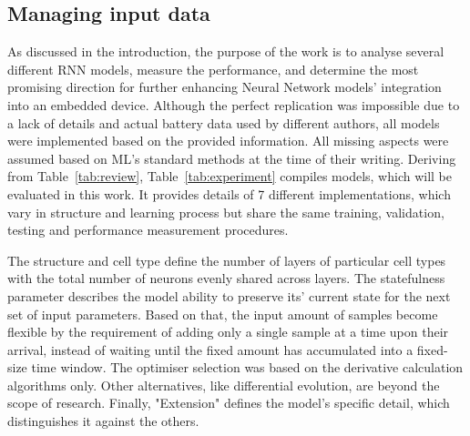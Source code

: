 %
%
\subsection{Managing input data} \label{subsec:RNN}
As discussed in the introduction, the purpose of the work is to analyse several different RNN models, measure the performance, and determine the most promising direction for further enhancing Neural Network models' integration into an embedded device.
Although the perfect replication was impossible due to a lack of details and actual battery data used by different authors, all models were implemented based on the provided information.
All missing aspects were assumed based on ML's standard methods at the time of their writing.
Deriving from Table~\ref{tab:review}, Table~\ref{tab:experiment} compiles models, which will be evaluated in this work.
It provides details of 7 different implementations, which vary in structure and learning process but share the same training, validation, testing and performance measurement procedures.

%
%
The structure and cell type define the number of layers of particular cell types with the total number of neurons evenly shared across layers.
The statefulness parameter describes the model ability to preserve its' current state for the next set of input parameters.
Based on that, the input amount of samples become flexible by the requirement of adding only a single sample at a time upon their arrival, instead of waiting until the fixed amount has accumulated into a fixed-size time window.
The optimiser selection was based on the derivative calculation algorithms only.
Other alternatives, like differential evolution, are beyond the scope of research.
Finally, "Extension" defines the model's specific detail, which distinguishes it against the others.

